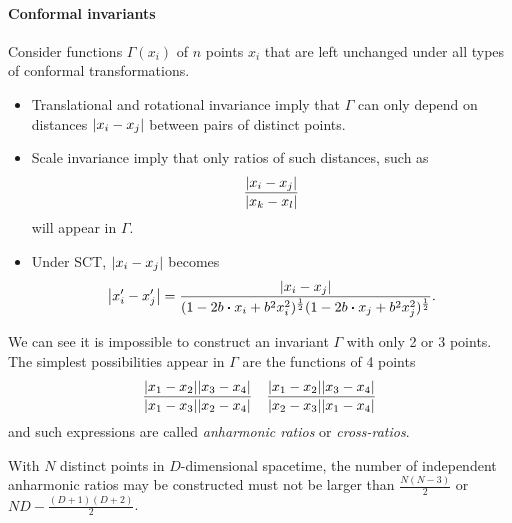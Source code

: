 \documentclass[10pt]{article}
\begin{document}
\paragraph{Conformal invariants}
Consider functions $\Gamma(x_i)$ of $n$ points $x_i$ that are left unchanged under all types of conformal transformations.
\begin{itemize}
    \item Translational and rotational invariance imply that $\Gamma$ can only depend on distances $\abs{x_i-x_j}$ between pairs of distinct points.
    \item Scale invariance imply that only ratios of such distances, such as
          \begin{align}
              \frac{\abs{x_i-x_j}}{\abs{x_k-x_l}}
          \end{align}
          will appear in $\Gamma$.
    \item Under SCT, $\abs{x_i-x_j}$ becomes
          \begin{align}
              \abs{x_i'-x_j'}=\frac{\abs{x_i-x_j}}{(1-2b\vdot x_i+b^2 x_i^2)^{\frac{1}{2}}(1-2b\vdot x_j+b^2 x_j^2)^{\frac{1}{2}}}.\label{eq:conformal_distance_trans}
          \end{align}
\end{itemize}
We can see it is impossible to construct an invariant $\Gamma$ with only 2 or 3 points.
The simplest possibilities appear in $\Gamma$ are the functions of 4 points
\begin{align}
    \frac{\abs{x_1-x_2}\abs{x_3-x_4}}{\abs{x_1-x_3}\abs{x_2-x_4}}\quad\frac{\abs{x_1-x_2}\abs{x_3-x_4}}{\abs{x_2-x_3}\abs{x_1-x_4}}\label{eq:anharmonic_ratio}
\end{align}
and such expressions are called \textit{anharmonic ratios} or \textit{cross-ratios}.
\begin{claim}
    With $N$ distinct points in $D$-dimensional spacetime, the number of independent anharmonic ratios may be constructed must not be larger than $\frac{N(N-3)}{2}$ or $ND-\frac{(D+1)(D+2)}{2}$.
\end{claim}
\end{document}
